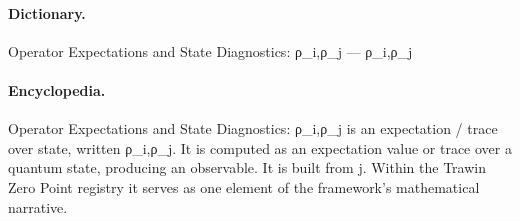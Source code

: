 \paragraph{Dictionary.}
Operator Expectations and State Diagnostics: ρ\_i,ρ\_j — ρ\_i,ρ\_j

\paragraph{Encyclopedia.}
Operator Expectations and State Diagnostics: ρ\_i,ρ\_j is an expectation / trace over state, written ρ\_i,ρ\_j. It is computed as an expectation value or trace over a quantum state, producing an observable. It is built from j. Within the Trawin Zero Point registry it serves as one element of the framework's mathematical narrative.
